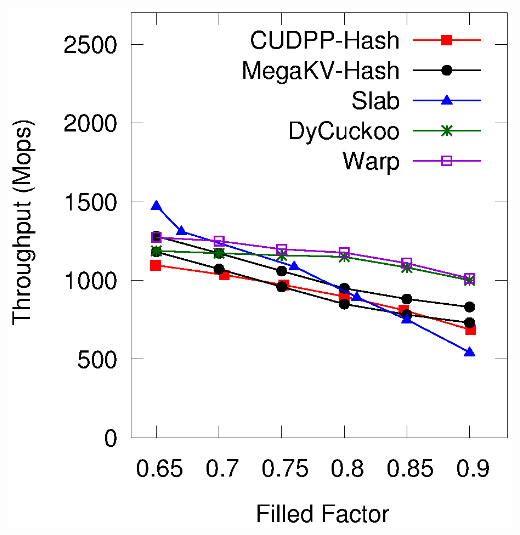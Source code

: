 \begin{minipage}{\textwidth}
\begin{minipage}[b]{0.49\textwidth}
\begin{minipage}{0.49\textwidth}
			\centerline{}
		\end{minipage}
	\end{minipage}
	\hfill
	\begin{minipage}[b]{0.49\textwidth}\centering
		\begin{minipage}{0.49\textwidth}\centering
			\includegraphics[width=\textwidth]{../pic/static-load_factor/tpch/insert.eps}
			\centerline{}
		\end{minipage}
		\begin{minipage}{0.49\textwidth}\centering

\end{minipage}
\end{minipage}
\end{minipage}
